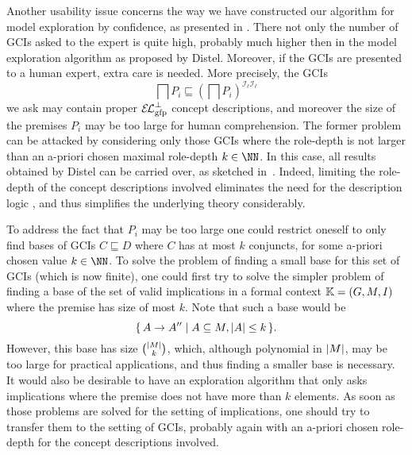 Another usability issue concerns the way we have constructed our algorithm for model
exploration by confidence, as presented in .  There not only
the number of GCIs asked to the expert is quite high, probably much higher then in the
model exploration algorithm as proposed by Distel.  Moreover, if the GCIs are presented to
a human expert, extra care is needed.  More precisely, the GCIs
\begin{equation*}
  \bigsqcap P_{i} \sqsubseteq (\bigsqcap P_{i})^{\mathcal{I}_{\ell}\mathcal{I}_{\ell}}
\end{equation*}
we ask may contain proper ${{\mathcal{E}\kern-.3ex\mathcal{L}}_\text{gfp}^\bot}$ concept descriptions, and moreover the size of the
premises $P_{i}$ may be too large for human comprehension.  The former problem can be
attacked by considering only those GCIs where the role-depth is not larger than an
a-priori chosen maximal role-depth $k \in \NN$.  In this case, all results obtained by
Distel can be carried over, as sketched in~\cite{FCA-and-Logics}.  Indeed, limiting the
role-depth of the concept descriptions involved eliminates the need for the description
logic \ELgfpbot, and thus simplifies the underlying theory considerably.

To address the fact that $P_{i}$ may be too large one could restrict oneself to only find
bases of GCIs $C \sqsubseteq D$ where $C$ has at most $k$ conjuncts, for some a-priori
chosen value $k \in \NN$.  To solve the problem of finding a small base for this set of
GCIs (which is now finite), one could first try to solve the simpler problem of finding a
base of the set of valid implications in a formal context ${\mathbb{K}} = (G, M, I)$ where the
premise has size of most $k$.  Note that such a base would be
\begin{equation*}
  {\ensuremath{\{\, A \to A'' \mid A \subseteq M, \lvert A\rvert \leq k \,\}}}.
\end{equation*}
However, this base has size $\binom{\lvert M\rvert}{k}$, which, although polynomial in $\lvert M\rvert$,
may be too large for practical applications, and thus finding a smaller base is necessary.
It would also be desirable to have an exploration algorithm that only asks implications
where the premise does not have more than $k$ elements.  As soon as those problems are
solved for the setting of implications, one should try to transfer them to the setting of
GCIs, probably again with an a-priori chosen role-depth for the concept descriptions
involved.


